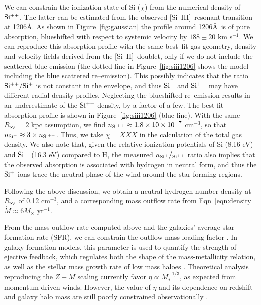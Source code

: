 \documentclass[manuscript]{emulateapj}
\newcommand{\siii}{[Si~{\small II}]}
\newcommand{\siiii}{[Si~{\small III}]}
\newcommand{\kms}{km s$^{-1}$}
\begin{document}
We can constrain the ionization state of Si ($\chi$) from the
numerical density of $\rm Si^{++}$. The latter can be estimated from
the observed \siiii\ resonant transition at 1206\AA. As shown in
Figure~\ref{fig:gaussian} the profile around 1206\AA\ is of pure
absorption, blueshifted with respect to systemic velocity by $188\pm
20$ \kms. We can reproduce this absorption profile with the same
best--fit gas geometry, density and velocity fields derived from the
\siii\ doublet, only if we do not include the scattered blue emission
(the dotted line in Figure~\ref{fig:siii1206} shows the model 
including the blue scattered re--emission). This possibly indicates
that the ratio $\rm Si^{++}/Si^{+}$ is not constant in the envelope,
and thus $\rm Si^+$ and $\rm Si^{++}$ may have different radial
density profiles. Neglecting the blueshifted re--emission results in
an underestimate of the $\rm Si^{++}$ density, by a factor of a
few. The best-fit absorption profile is shown in
Figure~\ref{fig:siii1206} (blue line). With the same $R_{SF}=2$ kpc
assumption, we find $n_{\rm Si^{++}}\approx 1.8 \times 10 \times
10^{-7}$ cm$^{-3}$, so that $n_{\rm Si^+}\approx 3 \times n_{\rm
  Si^{++}}$. Thus, we take $\chi = XXX$ in the calculation of the
total gas density. We also note that, given the relative ionization
potentials of Si (8.16 eV) and $\rm Si^+$ (16.3 eV) compared to H, the
measured $n_{\rm Si^+}/_{\rm Si^{++}}$ ratio also implies that the
observed absorption is associated with hydrogen in neutral form, and
thus the $\rm Si^+$ ions trace the neutral phase of the wind around
the star-forming regions.

Following the above discussion, we obtain a neutral hydrogen number
density at $R_{SF}$ of 0.12 cm$^{-3}$, and a corresponding mass
outflow rate from Eqn~\ref{eqn:density} $\dot{M} \approx 6 M_{\odot}$
yr$^{-1}$.

From the mass outflow rate computed above and the galaxies' average
star-formation rate (SFR), we can constrain the outflow mass loading
factor \citep[$\eta=\frac{\dot{M}}{SFR}$][]{dave2012}. In galaxy
formation models, this parameter is used to quantify the strength of
ejective feedback, which regulates both the shape of the
mass-metallicity relation, as well as the stellar mass growth rate of
low mass haloes \citep{dave2012,shen2012}. Theoretical analysis
reproducing the $Z-M$ scaling currently favor $\eta \propto
M_{*}^{-1/3}$, as expected from momentum-driven winds. However, the
value of $\eta$ and its dependence on redshift and galaxy halo mass
are still poorly constrained observationally
\citep[e.g.][]{martin2013}.
\end{document}
